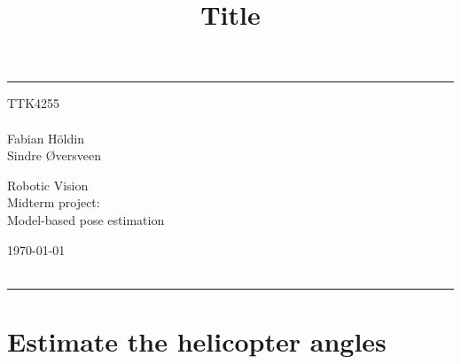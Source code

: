\documentclass[a4paper]{article} %
\begin{document}

    \title{Title} %
    \fancyhead[C]{}
    \hrule \medskip %
    \begin{minipage}{0.295\textwidth} %
        \raggedright
        TTK4255\\ %
        \footnotesize %
        \hfill\\
        Fabian Höldin \\
        Sindre {\O}versveen%
    \end{minipage}
    \begin{minipage}{0.4\textwidth} %
        \centering
        \large %
        Robotic Vision \\ %
        \normalsize %
        Midterm project:\\
        Model-based pose estimation\\ %
    \end{minipage}
    \begin{minipage}{0.295\textwidth} %
        \raggedleft
        \today\\ %
        \footnotesize %
        \hfill\\
    \end{minipage}
    \medskip\hrule %

\section{Estimate the helicopter angles}
\end{document}
